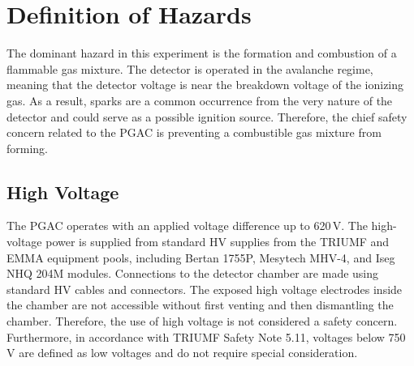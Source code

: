 \section{Definition of Hazards}
The dominant hazard in this experiment is the formation and combustion of a flammable gas
mixture.  The detector is operated in the avalanche regime, meaning that the detector voltage is near the breakdown voltage of the ionizing gas.  As a result, sparks are a common occurrence from the very nature of the detector and could serve as a possible ignition source.  Therefore, the chief safety concern related to the PGAC is preventing a combustible gas 
mixture from  forming.

\subsection{High Voltage}
The PGAC operates with an applied voltage difference up to 620\,V. The high-voltage power is supplied from standard HV supplies from the TRIUMF and EMMA equipment pools, including Bertan 1755P, Mesytech MHV-4, and Iseg NHQ 204M modules.  Connections to the detector chamber are made using standard HV cables and connectors. The exposed high voltage electrodes inside the chamber are not accessible without first venting and then dismantling the chamber.  Therefore, the use of high voltage is not considered a safety concern.  Furthermore, in accordance with TRIUMF Safety Note 5.11, voltages below 750\,V are defined as low voltages and do not require special consideration.
